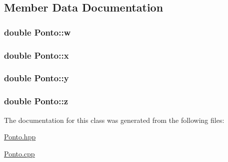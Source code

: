 \subsection{Member Data Documentation}
\hypertarget{classPonto_afb59351a6bdb8509302ffeda9ac77091}{
\subsubsection[{w}]{\setlength{\rightskip}{0pt plus 5cm}double Ponto\+::w}}\label{classPonto_afb59351a6bdb8509302ffeda9ac77091}
\hypertarget{classPonto_a19d9967c487a947f94938ce37346ed3c}{
\subsubsection[{x}]{\setlength{\rightskip}{0pt plus 5cm}double Ponto\+::x}}\label{classPonto_a19d9967c487a947f94938ce37346ed3c}
\hypertarget{classPonto_afc19597e54764ae43c0211a34adc98c8}{
\subsubsection[{y}]{\setlength{\rightskip}{0pt plus 5cm}double Ponto\+::y}}\label{classPonto_afc19597e54764ae43c0211a34adc98c8}
\hypertarget{classPonto_ab5f76e914355c1bb1c5542a0a6093f5c}{
\subsubsection[{z}]{\setlength{\rightskip}{0pt plus 5cm}double Ponto\+::z}}\label{classPonto_ab5f76e914355c1bb1c5542a0a6093f5c}


The documentation for this class was generated from the following files\+:\begin{DoxyCompactItemize}
\item 
\hyperlink{Ponto_8hpp}{Ponto.\+hpp}\item 
\hyperlink{Ponto_8cpp}{Ponto.\+cpp}\end{DoxyCompactItemize}
